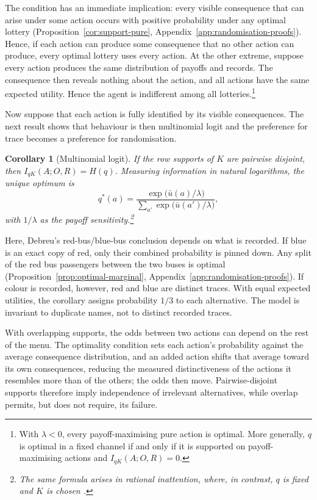 \documentclass[11pt,a4paper]{article}
\newtheorem{corollary}[theorem]{Corollary}
\theoremstyle{definition}
\newcommand{\I}{I}
\newcommand{\Sh}{H}
\newcommand{\1}{\mathbf 1}
\begin{document}
The condition has an immediate implication: every visible consequence that can arise under some action
occurs with positive probability under any optimal lottery (Proposition~\ref{cor:support-pure},
Appendix~\ref{app:randomisation-proofs}).  Hence, if each action can produce some consequence that no other action can produce, every optimal lottery uses every action. At the other extreme, suppose every action produces the same distribution of payoffs and records. The consequence then reveals nothing about the action, and all actions have the same expected utility. Hence the agent is indifferent among all lotteries.\footnote{With $\lambda<0$, every payoff-maximising pure action is optimal.  More generally, $q$ is optimal in a fixed channel if and only if it is supported on payoff-maximising actions and $\I_{qK}(A;O,R)=0$.}


Now suppose that each action is fully identified by its visible consequences.  The next result shows that behaviour is then multinomial logit and the preference for trace becomes a preference for randomisation.

\begin{corollary}[Multinomial logit]\label{rem:logit}
If the row supports of $K$ are pairwise disjoint, then $\I_{qK}(A;O,R)=\Sh(q)$. Measuring information in natural logarithms, the unique optimum is
\[
 q^*(a)
 =\frac{\exp\bigl(\bar u(a)/\lambda\bigr)}
 {\sum_{a'}\exp\bigl(\bar u(a')/\lambda\bigr)},
\]
with $1/\lambda$ as the payoff sensitivity.\footnote{The same formula arises in rational inattention, where, in contrast, $q$ is fixed and $K$ is chosen \cite{MatejkaMcKay2015}.}
\end{corollary}

Here, Debreu's red-bus/blue-bus conclusion depends on what is recorded.  If blue is an exact copy of red, only their combined probability is pinned down. Any split of the red bus passengers between the two buses is optimal (Proposition~\ref{prop:optimal-marginal}, Appendix~\ref{app:randomisation-proofs}).  If colour is recorded, however, red and blue are distinct traces.  With equal expected utilities, the corollary assigns probability $1/3$ to each alternative.  The model is invariant to duplicate names, not to distinct recorded traces.


With overlapping supports, the odds between two actions can depend on the rest of the menu.  The optimality
condition sets each action's probability against the average consequence distribution, and an added action
shifts that average toward its own consequences, reducing the measured distinctiveness of the actions it
resembles more than of the others; the odds then move.  Pairwise-disjoint supports therefore imply independence
of irrelevant alternatives, while overlap permits, but does not require, its failure.
\end{document}
